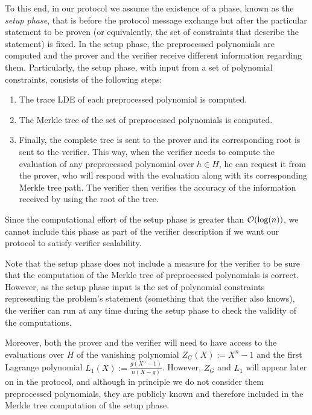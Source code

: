 To this end, in our protocol we assume the existence of a phase, known as the \textit{setup phase}, that is before the protocol message exchange but after the particular statement to be proven (or equivalently, the set of constraints that describe the statement) is fixed. In the setup phase, the preprocessed polynomials are computed and the prover and the verifier receive different information regarding them. Particularly, the setup phase, with input from a set of polynomial constraints, consists of the following steps:
\begin{enumerate}
  \item The trace LDE of each preprocessed polynomial is computed. 
  \item The Merkle tree of the set of preprocessed polynomials is computed.
  \item Finally, the complete tree is sent to the prover and its corresponding root is sent to the verifier. This way, when the verifier needs to compute the evaluation of any preprocessed polynomial over $h \in H$, he can request it from the prover, who will respond with the evaluation along with its corresponding Merkle tree path. The verifier then verifies the accuracy of the information received by using the root of the tree.
\end{enumerate}
\begin{remark}
  Since the computational effort of the setup phase is greater than $\mathcal{O}(\log(n))$, we cannot include this phase as part of the verifier description if we want our protocol to satisfy verifier scalability.
\end{remark} 

Note that the setup phase does not include a measure for the verifier to be sure that the computation of the Merkle tree of preprocessed polynomials is correct. However, as the setup phase input is the set of polynomial constraints representing the problem's statement (something that the verifier also knows), the verifier can run at any time during the setup phase to check the validity of the computations.

Moreover, both the prover and the verifier will need to have access to the evaluations over $H$ of the vanishing polynomial $Z_G(X) := X^n -1$ and the first Lagrange polynomial $L_1(X) := \frac{g(X^n-1)}{n(X-g)}$. However, $Z_G$ and $L_1$ will appear later on in the protocol, and although in principle we do not consider them preprocessed polynomials, they are publicly known and therefore included in the Merkle tree computation of the setup phase.


